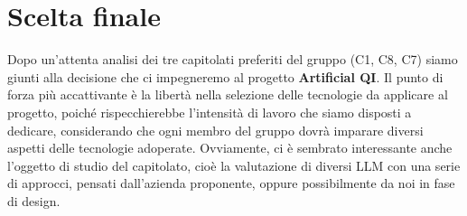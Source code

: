 \documentclass[10pt]{article}
\begin{document}
    \newpage
    \section{Scelta finale}
    Dopo un'attenta analisi dei tre capitolati preferiti del gruppo (C1, C8, C7) siamo giunti alla decisione che
    ci impegneremo al progetto \textbf{Artificial QI}. Il punto di forza più accattivante è la libertà
    nella selezione delle tecnologie da applicare al progetto, poiché rispecchierebbe l'intensità di lavoro che siamo
    disposti a dedicare, considerando che ogni membro del gruppo dovrà imparare diversi aspetti delle tecnologie adoperate.
    Ovviamente, ci è sembrato interessante anche l'oggetto di studio del capitolato, cioè la valutazione
    di diversi LLM con una serie di approcci, pensati dall'azienda proponente, oppure possibilmente da noi in fase di design.

    
\end{document}
